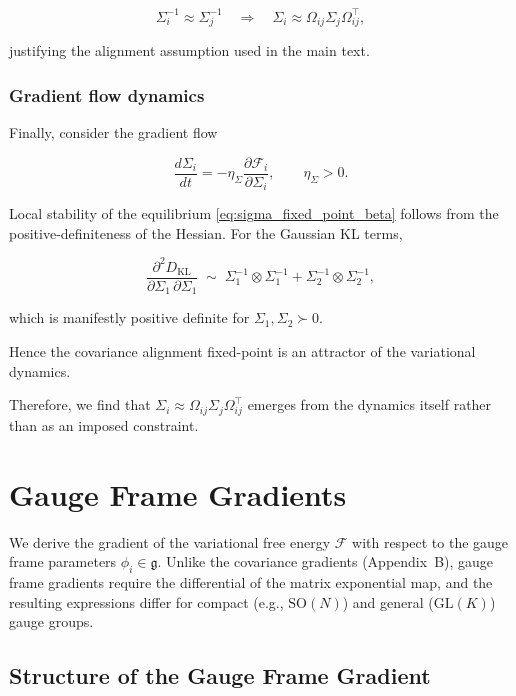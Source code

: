 \documentclass[twoside,11pt]{article}
\begin{document}
\begin{equation}
\Sigma_i^{-1} \approx \Sigma_j^{-1}
\quad\Longrightarrow\quad
\Sigma_i \approx \Omega_{ij}\Sigma_j\Omega_{ij}^\top,
\end{equation}

justifying the alignment assumption used in the main text.

\subsubsection{Gradient flow dynamics}

Finally, consider the gradient flow

\begin{equation}
\frac{d\Sigma_i}{dt}
=-\eta_\Sigma
\frac{\partial \mathcal{F}_i}{\partial \Sigma_i},
\qquad\eta_\Sigma > 0.
\end{equation}

Local stability of the equilibrium \eqref{eq:sigma_fixed_point_beta} follows from the positive-definiteness of the Hessian. For the Gaussian KL terms,

\begin{equation}
\frac{\partial^2 D_{\mathrm{KL}}}{\partial \Sigma_1 \, \partial \Sigma_1}
\;\sim\;
\Sigma_1^{-1} \otimes \Sigma_1^{-1}
+ \Sigma_2^{-1} \otimes \Sigma_2^{-1},
\end{equation}

which is manifestly positive definite for $\Sigma_1,\Sigma_2 \succ 0$.

Hence the covariance alignment fixed-point is an attractor of the variational dynamics.

Therefore, we find that $\Sigma_i \approx \Omega_{ij}\Sigma_j\Omega_{ij}^\top$ emerges from the dynamics itself rather than as an imposed constraint.


\section{Gauge Frame Gradients}
\label{app:phi_gradients}

We derive the gradient of the variational free energy $\mathcal{F}$ with respect to the gauge frame parameters $\phi_i \in \mathfrak{g}$. Unlike the covariance gradients (Appendix~B), gauge frame gradients require the differential of the matrix exponential map, and the resulting expressions differ for compact (e.g., $\mathrm{SO}(N)$) and general ($\mathrm{GL}(K)$) gauge groups.

\subsection{Structure of the Gauge Frame Gradient}
\end{document}
